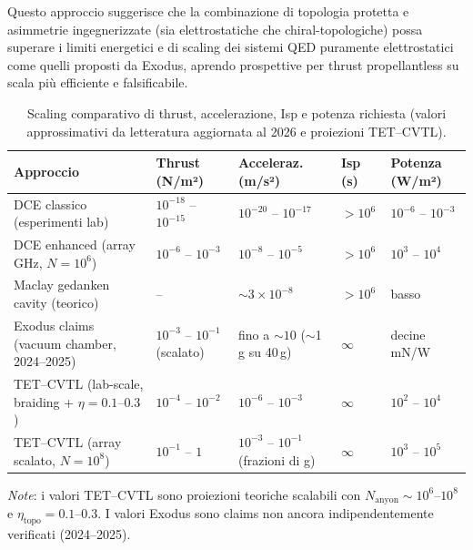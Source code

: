 \documentclass[11pt,a4paper]{article}
\theoremstyle{plain}
\theoremstyle{definition}
\begin{document}
Questo approccio suggerisce che la combinazione di topologia protetta e asimmetrie ingegnerizzate (sia elettrostatiche che chiral-topologiche) possa superare i limiti energetici e di scaling dei sistemi QED puramente elettrostatici come quelli proposti da Exodus, aprendo prospettive per thrust propellantless su scala più efficiente e falsificabile.


\vspace{0.3cm}


\begin{table}[H]
\centering
\caption{Scaling comparativo di thrust, accelerazione, Isp e potenza richiesta (valori approssimativi da letteratura aggiornata al 2026 e proiezioni TET--CVTL).}
\normalsize
{}  %
\begin{tabularx}{\textwidth}{
  | >{\raggedright\arraybackslash}p{4.2cm}   %
  | >{\centering\arraybackslash}X             %
  | >{\centering\arraybackslash}X             %
  | >{\centering\arraybackslash}X             %
  | >{\centering\arraybackslash}X            %
  |                                      %
}
\hline
\textbf{Approccio} & \textbf{Thrust (N/m²)} & \textbf{Acceleraz. (m/s²)} & \textbf{Isp (s)} & \textbf{Potenza (W/m²)} \\
\hline
DCE classico (esperimenti lab) 
    & $10^{-18}$ -- $10^{-15}$ 
    & $10^{-20}$ -- $10^{-17}$ 
    & $>10^6$ 
    & $10^{-6}$ -- $10^{-3}$ \\
\hline
DCE enhanced (array GHz, $N=10^6$) 
    & $10^{-6}$ -- $10^{-3}$ 
    & $10^{-8}$ -- $10^{-5}$ 
    & $>10^6$ 
    & $10^3$ -- $10^4$ \\
\hline
Maclay gedanken cavity (teorico) 
    & -- 
    & $\sim 3\times10^{-8}$ 
    & $>10^6$ 
    & basso \\
\hline
Exodus claims (vacuum chamber, 2024–2025) 
    & $10^{-3}$ -- $10^{-1}$ (scalato) 
    & fino a $\sim 10$ ($\sim$1\,g su 40\,g) 
    & $\infty$ 
    & decine mN/W \\
\hline
TET--CVTL (lab-scale, braiding + $\eta=0.1$–$0.3$) 
    & $10^{-4}$ -- $10^{-2}$ 
    & $10^{-6}$ -- $10^{-3}$ 
    & $\infty$ 
    & $10^2$ -- $10^4$ \\
\hline
TET--CVTL (array scalato, $N=10^8$) 
    & $10^{-1}$ -- $1$ 
    & $10^{-3}$ -- $10^{-1}$ (frazioni di g) 
    & $\infty$ 
    & $10^3$ -- $10^5$ \\
\hline
\end{tabularx}
\vspace{1em}

\vspace{0.2cm}

{\normalsize
\textit{Note}: i valori TET--CVTL sono proiezioni teoriche scalabili con $N_{\mathrm{anyon}} \sim 10^6$--$10^8$ e $\eta_{\mathrm{topo}} = 0.1$–$0.3$. I valori Exodus sono claims non ancora indipendentemente verificati (2024–2025). 
}
\label{tab:scaling-comparative}
\end{table}
\end{document}

